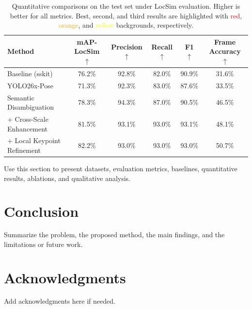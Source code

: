 \documentclass[runningheads]{llncs}
\begin{document}
\begin{table}[t]
      \centering
      \setlength{\tabcolsep}{9pt} %
      \caption{Quantitative comparisons on the test set under LocSim evaluation. Higher is better for all metrics. Best, second, and third results are highlighted with \textcolor{red}{red}, \textcolor{orange}{orange}, and \textcolor{yellow}{yellow} backgrounds, respectively.}
      \label{tab:locsim_main_results}
      \begin{tabular}{lccccc}
      \hline
      Method & mAP-LocSim $\uparrow$ & Precision $\uparrow$ & Recall $\uparrow$ & F1 $\uparrow$ & Frame Accuracy $
  \uparrow$ \\
      \hline
      Baseline (sskit) & 76.2\% & 92.8\% & \cellcolor{yellow!35}82.0\% & \cellcolor{yellow!35}90.9\% & 31.6\% \\
      YOLO26x-Pose & 71.3\% & 92.3\% & 83.0\% & 87.6\% & 33.5\% \\
      Semantic Disambiguation & \cellcolor{yellow!35}78.3\% & \cellcolor{red!25}94.3\% & \cellcolor{orange!35}87.0\% &
  90.5\% & \cellcolor{yellow!35}46.5\% \\
      + Cross-Scale Enhancement & \cellcolor{orange!35}81.5\% & \cellcolor{orange!35}93.1\% & \cellcolor{red!25}93.0\% &
  \cellcolor{red!25}93.1\% & \cellcolor{orange!35}48.1\% \\
      + Local Keypoint Refinement & \cellcolor{red!25}82.2\% & \cellcolor{yellow!35}93.0\% & \cellcolor{red!25}93.0\% &
  \cellcolor{orange!35}93.0\% & \cellcolor{red!25}50.7\% \\
      \hline
      \end{tabular}
  \end{table}
  
Use this section to present datasets, evaluation metrics, baselines, quantitative results, ablations, and qualitative analysis.

\section{Conclusion}

Summarize the problem, the proposed method, the main findings, and the limitations or future work.

\section*{Acknowledgments}
Add acknowledgments here if needed.



\end{document}
